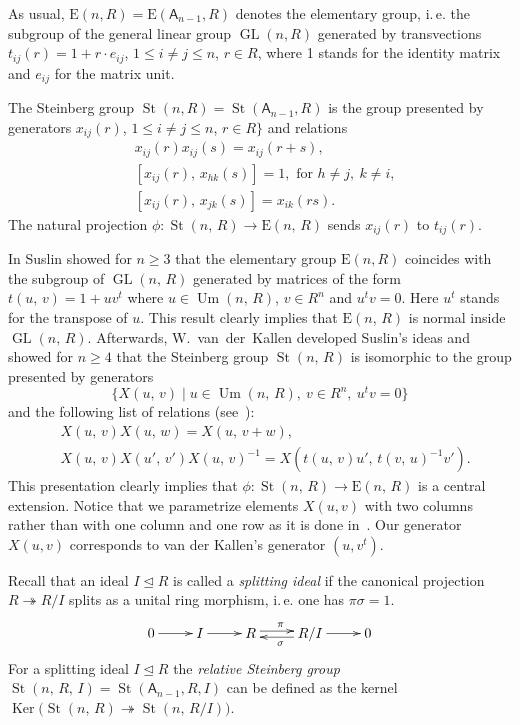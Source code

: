 \documentclass[11pt]{amsart}
\theoremstyle{plain} \declaretheorem[name=Theorem, Refname={Theorem,Theorems}]{tm} \Crefname{tm}{Theorem}{Theorems}
\numberwithin{equation}{section}
\theoremstyle{definition} \newtheorem{df}[lm]{Definition} \Crefname{df}{Definition}{Definitions}
\theoremstyle{remark} \newtheorem{rk}[lm]{Remark} \Crefname{rk}{Remark}{Remarks}
\newcommand{\Ker}{\mathop{\mathrm{Ker}}\nolimits}
\newcommand{\E}{{\mathrm{E}}}
\newcommand{\Um}{\mathop{\mathrm{Um}}\nolimits}
\newcommand{\St}{\mathop{\mathrm{St}}\nolimits}
\newcommand{\GL}{\mathop{\mathrm{GL}}\nolimits}
\newcommand{\epi}{\twoheadrightarrow}
\newcommand{\inv}{^{-1}}
\newcommand{\rA}{\mathsf{A}}
\begin{document}
As usual, $\E(n, R)=\E(\rA_{n-1}, R)$ denotes the elementary group, i.\,e. the subgroup of the general linear group $\GL(n, R)$ generated by transvections
$t_{ij}(r)=1+r \cdot e_{ij}$, $1\leq i\neq j\leq n$, $r\in R$,
where 1 stands for the identity matrix and $e_{ij}$ for the matrix unit.

The Steinberg group $\St(n, R) = \St(\rA_{n-1}, R)$ is the group presented by generators
$x_{ij}(r)$, $1\leq i\neq j\leq n$, $r\in R\}$ and relations
\setcounter{equation}{0}
\renewcommand{\theequation}{S\arabic{equation}}
\begin{align}
&x_{ij}(r)x_{ij}(s)=x_{ij}(r+s), \label{add0}\\
&[x_{ij}(r),\,x_{hk}(s)]=1,\text{ for }h\neq j,\ k\neq i, \label{ccf1}\\
&[x_{ij}(r),\,x_{jk}(s)]=x_{ik}(rs) \label{ccf2}.
\end{align}
The natural projection $\phi\colon\St(n,\,R)\rightarrow\E(n,\,R)$ sends $x_{ij}(r)$ to $t_{ij}(r)$.

In \cite{Sus} Suslin showed for $n\geq 3$ that the elementary group $\E(n, R)$ coincides with the subgroup of $\GL(n,\,R)$ generated by matrices
of the form $t(u,\,v)=1+uv^t$ where $u\in\Um(n,\,R)$, $v\in R^n$ and $u^tv=0$. Here $u^t$ stands for the transpose of $u$.
This result clearly implies that $\E(n,\,R)$ is normal inside $\GL(n,\,R)$.
Afterwards, W.~van~der~Kallen developed Suslin's ideas and showed for $n\geq4$ that the Steinberg group $\St(n,\,R)$ is isomorphic to the group presented by generators
$$\{X(u,\,v)\mid u\in\Um(n,\,R),\ v\in R^n,\ u^tv=0\}$$ and the following list of relations (see~\cite[Theorem~1]{vdK}):
\setcounter{equation}{0} \renewcommand{\theequation}{K\arabic{equation}}
\begin{align}
&X(u,\,v)X(u,\,w)=X(u,\,v+w), \label{add1} \\
&X(u,\,v)X(u',\,v')X(u,\,v)\inv=X(t(u,\,v)u',\,t(v,\,u)\inv v'). \label{conj1}
\end{align}
This presentation clearly implies that $\phi\colon\St(n,\,R)\rightarrow\E(n,\,R)$ is a central extension.
Notice that we parametrize elements $X(u, v)$ with two columns rather than with one column and one row as it is done in~\cite{vdK}.
Our generator $X(u,v)$ corresponds to van der Kallen's generator $(u, v^t)$.

Recall that an ideal $I\trianglelefteq R$ is called a \emph{splitting ideal} if the canonical projection $R \twoheadrightarrow R/I$ splits as a unital ring morphism, i.\,e. one has $\pi\sigma=1$.
$$\xymatrix{0\ar@<0.1ex>[r]^{}&I\ar@<0.1ex>[r]^{}&R\ar@<0.5ex>[r]^{\pi}&R/I\ar@<0.5ex>[l]^{\sigma}\ar@<0.1ex>[r]^{}&0}$$
For a splitting ideal $I\trianglelefteq R$ the \emph{relative Steinberg group} $\St(n,\,R,\,I) = \St(\rA_{n-1}, R, I)$ can be defined as the kernel $\Ker\big(\St(n,\,R)\epi\St(n,\,R/I)\big)$.
\end{document}
